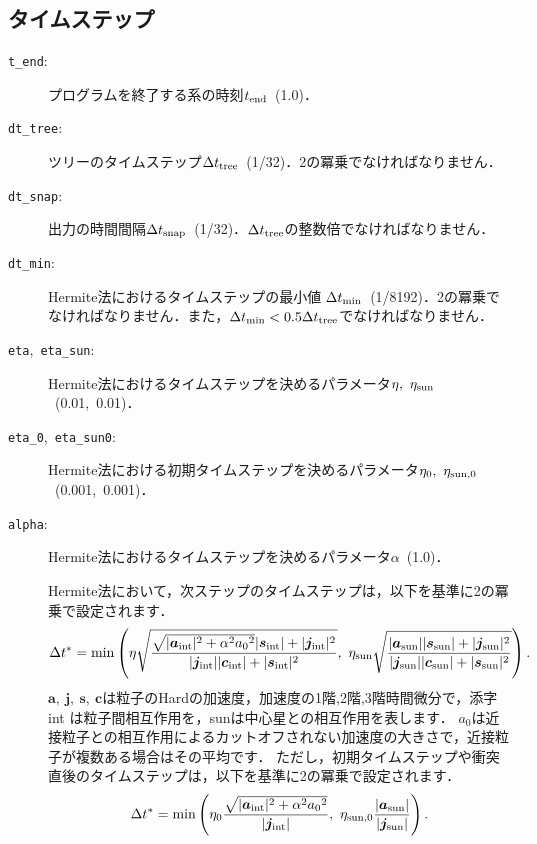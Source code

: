 \documentclass[12pt,a4paper,dvipdfmx]{jsarticle}
\begin{document}
\subsection{タイムステップ\label{timestep}}
\begin{description}
\item[\texttt{t\_end}:]
プログラムを終了する系の時刻$t_{\rm end}$\ (1.0)．
\item[\texttt{dt\_tree}:]
ツリーのタイムステップ$\Delta t_{\rm tree}$\ (1/32)．2の冪乗でなければなりません．
\item[\texttt{dt\_snap}:]
出力の時間間隔$\Delta t_{\rm snap}$\ (1/32)．$\Delta t_{\rm tree}$の整数倍でなければなりません．
\item[\texttt{dt\_min}:]
Hermite法におけるタイムステップの最小値$\ \Delta t_{\rm min}$\ (1/8192)．2の冪乗でなければなりません．また，$\Delta t_{\rm min}<0.5\Delta t_{\rm tree}$でなければなりません．
\item[\texttt{eta},\ \texttt{eta\_sun}:]
Hermite法におけるタイムステップを決めるパラメータ$\eta,\ \eta_{\rm sun}$\ (0.01,\ 0.01)．
\item[\texttt{eta\_0},\ \texttt{eta\_sun0}:]
Hermite法における初期タイムステップを決めるパラメータ$\eta_{0},\ \eta_{\rm sun, 0}$\ (0.001,\ 0.001)．
\item[\texttt{alpha}:]
Hermite法におけるタイムステップを決めるパラメータ$\alpha$\ (1.0)．

Hermite法において，次ステップのタイムステップは，以下を基準に2の冪乗で設定されます．
\begin{equation}
\Delta t^{*} = \min\left(
\eta\sqrt{\frac{\sqrt{|\bm{a}_{\rm int}|^{2}+\alpha^{2}{a_{0}}^{2}}|\bm{s}_{\rm int}|+|\bm{j}_{\rm int}|^{2}}{|\bm{j}_{\rm int}||\bm{c}_{\rm int}|+|\bm{s}_{\rm int}|^{2}}},\ 
\eta_{\rm sun}\sqrt{\frac{|\bm{a}_{\rm sun}||\bm{s}_{\rm sun}|+|\bm{j}_{\rm sun}|^{2}}{|\bm{j}_{\rm sun}||\bm{c}_{\rm sun}|+|\bm{s}_{\rm sun}|^{2}}}
\right).
\end{equation}
$\bm{a},\ \bm{j},\ \bm{s},\ \bm{c}$は粒子のHardの加速度，加速度の1階,2階,3階時間微分で，添字 int は粒子間相互作用を，sunは中心星との相互作用を表します．
$a_{0}$は近接粒子との相互作用によるカットオフされない加速度の大きさで，近接粒子が複数ある場合はその平均です．
ただし，初期タイムステップや衝突直後のタイムステップは，以下を基準に2の冪乗で設定されます．
\begin{equation}
\Delta t^{*} = \min\left(
\eta_{0}\frac{\sqrt{|\bm{a}_{\rm int}|^{2}+\alpha^{2}{a_{0}}^{2}}}{|\bm{j}_{\rm int}|},\ 
\eta_{\rm sun, 0}\frac{|\bm{a}_{\rm sun}|}{|\bm{j}_{\rm sun}|}
\right).
\end{equation}


\end{description}
\end{document}
